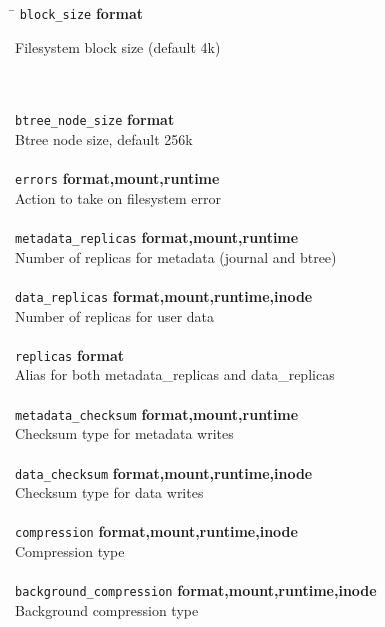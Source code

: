 \documentclass{article}
\begin{document}
\begin{tabbing}
\hspace{0.2in} \= \kill
	\texttt{block\_size}		\` \textbf{format}			\\
	\> \parbox{4.3in}{Filesystem block size (default 4k)}			\\ \\

	\texttt{btree\_node\_size}	\` \textbf{format}			\\
	\> Btree node size, default 256k					\\ \\

	\texttt{errors}			\` \textbf{format,mount,runtime}		\\
	\> Action to take on filesystem error					\\ \\

	\texttt{metadata\_replicas}	\` \textbf{format,mount,runtime}	\\
	\> Number of replicas for metadata (journal and btree)			\\ \\

	\texttt{data\_replicas}		\` \textbf{format,mount,runtime,inode}	\\
	\> Number of replicas for user data					\\ \\

	\texttt{replicas}		\` \textbf{format}			\\
	\> Alias for both metadata\_replicas and data\_replicas			\\ \\

	\texttt{metadata\_checksum}	\` \textbf{format,mount,runtime}	\\
	\> Checksum type for metadata writes					\\ \\

	\texttt{data\_checksum}		\` \textbf{format,mount,runtime,inode}	\\
	\> Checksum type for data writes					\\ \\

	\texttt{compression}		\` \textbf{format,mount,runtime,inode}	\\
	\> Compression type							\\ \\

	\texttt{background\_compression} \` \textbf{format,mount,runtime,inode}	\\
	\> Background compression type						\\ \\


\end{tabbing}
\end{document}
